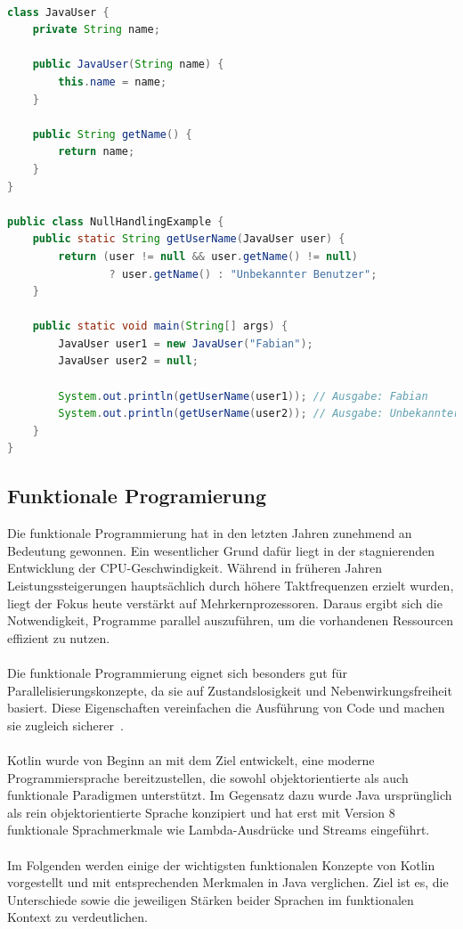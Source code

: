 \documentclass[11pt]{article}
\begin{document}
    \begin{lstlisting}[language=Java, caption={NullHandlingExample.java}, label={lst:java-user-null-safety}]

class JavaUser {
    private String name;

    public JavaUser(String name) {
        this.name = name;
    }

    public String getName() {
        return name;
    }
}

public class NullHandlingExample {
    public static String getUserName(JavaUser user) {
        return (user != null && user.getName() != null)
                ? user.getName() : "Unbekannter Benutzer";
    }

    public static void main(String[] args) {
        JavaUser user1 = new JavaUser("Fabian");
        JavaUser user2 = null;

        System.out.println(getUserName(user1)); // Ausgabe: Fabian
        System.out.println(getUserName(user2)); // Ausgabe: Unbekannter Benutzer
    }
}
    \end{lstlisting}

    \subsection{Funktionale Programierung}

    Die funktionale Programmierung hat in den letzten Jahren zunehmend an Bedeutung gewonnen.
    Ein wesentlicher Grund dafür liegt in der stagnierenden Entwicklung der CPU-Geschwindigkeit.
    Während in früheren Jahren Leistungssteigerungen hauptsächlich durch höhere Taktfrequenzen erzielt wurden, liegt der Fokus heute verstärkt auf Mehrkernprozessoren.
    Daraus ergibt sich die Notwendigkeit, Programme parallel auszuführen, um die vorhandenen Ressourcen effizient zu nutzen.\\
    \\
    Die funktionale Programmierung eignet sich besonders gut für Parallelisierungskonzepte, da sie auf Zustandslosigkeit und Nebenwirkungsfreiheit basiert.
    Diese Eigenschaften vereinfachen die Ausführung von Code und machen sie zugleich sicherer~\cite[129]{kotlin-patterns}.\\
    \\
    Kotlin wurde von Beginn an mit dem Ziel entwickelt, eine moderne Programmiersprache bereitzustellen, die sowohl objektorientierte als auch funktionale Paradigmen unterstützt.
    Im Gegensatz dazu wurde Java ursprünglich als rein objektorientierte Sprache konzipiert und hat erst mit Version 8 funktionale Sprachmerkmale wie Lambda-Ausdrücke und Streams eingeführt.\\
    \\
    Im Folgenden werden einige der wichtigsten funktionalen Konzepte von Kotlin vorgestellt und mit entsprechenden Merkmalen in Java verglichen.
    Ziel ist es, die Unterschiede sowie die jeweiligen Stärken beider Sprachen im funktionalen Kontext zu verdeutlichen.
\end{document}
